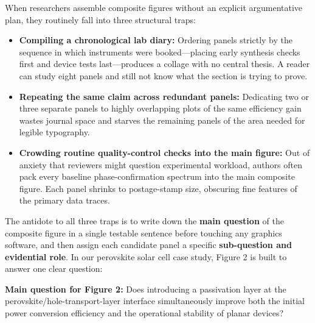 When researchers assemble composite figures without an explicit argumentative plan, they routinely fall into three structural traps:
\begin{itemize}
\item \textbf{Compiling a chronological lab diary:} Ordering panels strictly by the sequence in which instruments were booked---placing early synthesis checks first and device tests last---produces a collage with no central thesis. A reader can study eight panels and still not know what the section is trying to prove.
\item \textbf{Repeating the same claim across redundant panels:} Dedicating two or three separate panels to highly overlapping plots of the same efficiency gain wastes journal space and starves the remaining panels of the area needed for legible typography.
\item \textbf{Crowding routine quality-control checks into the main figure:} Out of anxiety that reviewers might question experimental workload, authors often pack every baseline phase-confirmation spectrum into the main composite figure. Each panel shrinks to postage-stamp size, obscuring fine features of the primary data traces.
\end{itemize}

The antidote to all three traps is to write down the \textbf{main question} of the composite figure in a single testable sentence before touching any graphics software, and then assign each candidate panel a specific \textbf{sub-question and evidential role}. In our perovskite solar cell case study, Figure 2 is built to answer one clear question:

\begin{BookNote}
\textbf{Main question for Figure 2:} Does introducing a passivation layer at the perovskite/hole-transport-layer interface simultaneously improve both the initial power conversion efficiency and the operational stability of planar devices?
\end{BookNote}

